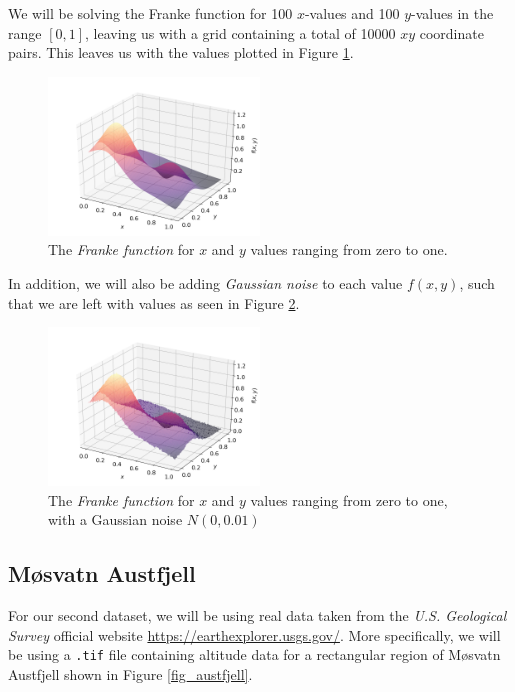 \documentclass[a4paper,10pt,english]{article}
\begin{document}
We will be solving the Franke function for 100 $x$-values and 100 $y$-values in the range $[0,1]$, leaving us with a grid containing a total of 10000 $xy$ coordinate pairs.  This leaves us with the values plotted in Figure \ref{fig_Franke}.

\begin{figure}[H]
	\centering
	\includegraphics[width = 0.5\textwidth, center]{../franke_output/Franke.png}
	\caption{The \textit{Franke function} for $x$ and $y$ values ranging from zero to one. \label{fig_Franke}}
\end{figure}

In addition, we will also be adding \textit{Gaussian noise} to each value $f(x,y)$, such that we are left with values as seen in Figure \ref{fig_Franke_noise}.

\begin{figure}[H]
	\centering
	\includegraphics[width = 0.5\textwidth, center]{../franke_output/Franke_noise.png}
	\caption{The \textit{Franke function} for $x$ and $y$ values ranging from zero to one, with a Gaussian noise $N(0,0.01)$\label{fig_Franke_noise}}
\end{figure}

\subsection*{Møsvatn Austfjell}

For our second dataset, we will be using real data taken from the \textit{U.S. Geological Survey} \cite{earthexplorer} official website \url{https://earthexplorer.usgs.gov/}.  More specifically, we will be using a \texttt{.tif} file containing altitude data for a rectangular region of Møsvatn Austfjell shown in Figure \ref{fig_austfjell}.
\end{document}
